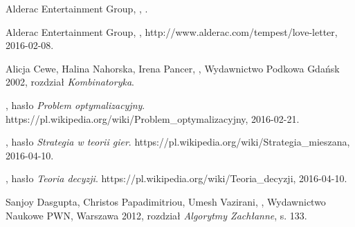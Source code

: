 \documentclass[11pt]{aghdpl}
\author{Damian Malarczyk}
\date{2015}
\begin{document}
\titlepages
\setcounter{tocdepth}{3}
\tableofcontents
\clearpage









\begin{thebibliography}{1}
	
\bibitem{}
\label{bib:loveLetterGame}
Alderac Entertainment Group,
,
.


\bibitem{}
\label{bib:loveLetterWebsite}
Alderac Entertainment Group,
,
\newblock http://www.alderac.com/tempest/love-letter, 2016-02-08.

\bibitem{}
\label{bib:tabliceMatematyczne}
Alicja Cewe, Halina Nahorska, Irena Pancer,
,
\newblock Wydawnictwo Podkowa Gdańsk 2002,
\newblock rozdział {\em Kombinatoryka}.

\bibitem{}
\label{bib:wiki_ProblemOptymalizacyjny}
, hasło {\em Problem optymalizacyjny}.
\newblock https://pl.wikipedia.org/wiki/Problem\_optymalizacyjny, 2016-02-21.

\bibitem{}
\label{bib:wiki_StrategiaTeoriaGier}
, hasło {\em Strategia w teorii gier}.
\newblock https://pl.wikipedia.org/wiki/Strategia\_mieszana, 2016-04-10.

\bibitem{}
\label{bib:wiki_TeoriaDecyzji}
, hasło {\em Teoria decyzji}.
\newblock https://pl.wikipedia.org/wiki/Teoria\_decyzji, 2016-04-10.

\bibitem{}
\label{bib:algorytmy_zachlanny}
Sanjoy Dasgupta, Christos Papadimitriou, Umesh Vazirani,
,
\newblock Wydawnictwo Naukowe PWN, Warszawa 2012,
\newblock rozdział {\em Algorytmy Zachłanne}, s. 133.

\end{thebibliography}
\end{document}
